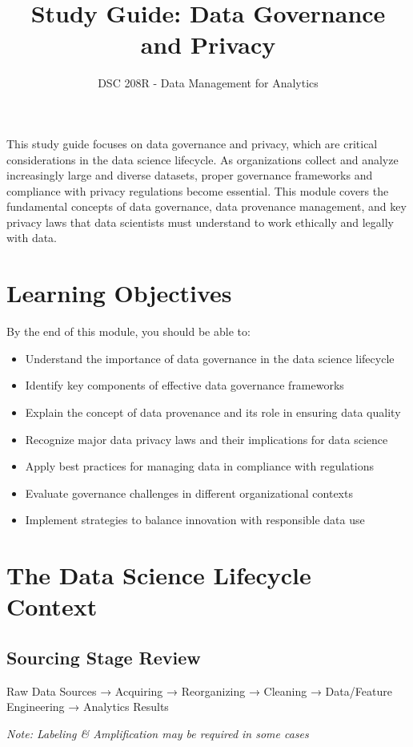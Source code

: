 \documentclass[12pt]{article}
\title{Study Guide: Data Governance and Privacy}
\author{DSC 208R - Data Management for Analytics}
\date{}
\begin{document}
\maketitle

\begin{tcolorbox}[colback=blue!5!white,colframe=blue!75!black,title={Overview}]
This study guide focuses on data governance and privacy, which are critical considerations in the data science lifecycle. As organizations collect and analyze increasingly large and diverse datasets, proper governance frameworks and compliance with privacy regulations become essential. This module covers the fundamental concepts of data governance, data provenance management, and key privacy laws that data scientists must understand to work ethically and legally with data.
\end{tcolorbox}

\section{Learning Objectives}

By the end of this module, you should be able to:

\begin{itemize}
    \item Understand the importance of data governance in the data science lifecycle
    \item Identify key components of effective data governance frameworks
    \item Explain the concept of data provenance and its role in ensuring data quality
    \item Recognize major data privacy laws and their implications for data science
    \item Apply best practices for managing data in compliance with regulations
    \item Evaluate governance challenges in different organizational contexts
    \item Implement strategies to balance innovation with responsible data use
\end{itemize}

\section{The Data Science Lifecycle Context}

\subsection{Sourcing Stage Review}
\begin{tcolorbox}[colback=green!5!white,colframe=green!75!black,title={Sourcing Process Flow}]
Raw Data Sources → Acquiring → Reorganizing → Cleaning → Data/Feature Engineering → Analytics Results

\textit{Note: Labeling \& Amplification may be required in some cases}
\end{tcolorbox}
\end{document}
